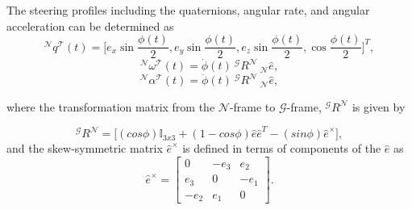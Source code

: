 \documentclass[letterpaper, paper,12pt]{AAS}		%
\begin{document}
	
	
		The steering profiles including the quaternions, angular rate, and angular acceleration can be determined as
		\begin{equation}\label{quatT}
		^\mathcal{N}q^\mathcal{T}(t)=\Big[e_x\sin\frac{\phi(t)}{2}, e_y\sin\frac{\phi(t)}{2}, e_z\sin\frac{\phi(t)}{2}, \cos\frac{\phi(t)}{2}\Big]^T,
		\end{equation}
		\begin{equation}\label{omegaT}
		^\mathcal{N}\omega^\mathcal{T}(t)=\dot{\phi}(t)\ ^\mathcal{G}R^\mathcal{N}\ _\mathcal{N}\hat{e},
		\end{equation}
		\begin{equation}\label{alpha_1}
		^\mathcal{N}\alpha^\mathcal{T}(t)=\ddot{\phi}(t)\ ^\mathcal{G}R^\mathcal{N}\ _\mathcal{N}\hat{e},
		\end{equation}

		
where the transformation matrix from the $\mathcal{N}$-frame to $\mathcal{G}$-frame, $^\mathcal{G}R^\mathcal{N}$ is given by

\begin{equation} \label{G_R_N}
^\mathcal{G}R^\mathcal{N}= \big[(cos\phi)\mathbb{I}_{3x3} + (1 - cos\phi)\hat{e}\hat{e}^T - (sin\phi)\hat{e}^\times \big],
\end{equation}
and the skew-symmetric matrix $\hat{e}^\times$ is defined in terms of components of the $\hat{e}$ as
\begin{equation}
	\hat{e}^\times=\begin{bmatrix}
	0 & -e_3 & e_2 \\
	 e_3 & 0& -e_1 \\
	-e_2 & e_1 & 0  
	\end{bmatrix}.
\end{equation}
\end{document}
